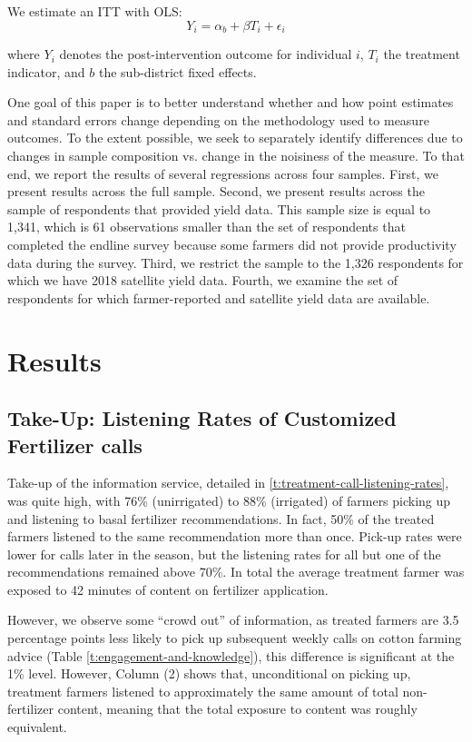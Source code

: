\documentclass{article}
\begin{document}
We estimate an ITT with OLS:
$$
Y_i = \alpha_b + \beta T_i + \epsilon_i
$$

where $Y_i$ denotes the post-intervention outcome for individual $i$, $T_i$ the treatment indicator, and $b$ the sub-district fixed effects.

One goal of this paper is to better understand whether and how point estimates and standard errors change depending on the methodology used to measure outcomes. To the extent possible, we seek to separately identify differences due to changes in sample composition vs. change in the noisiness of the measure. To that end, we report the results of several regressions across four samples. First, we present results across the full sample. Second, we present results across the sample of respondents that provided yield data. This sample size is equal to 1,341, which is 61 observations smaller than the set of respondents that completed the endline survey because some farmers did not provide productivity data during the survey. Third, we restrict the sample to the 1,326 respondents for which we have 2018 satellite yield data. Fourth, we examine the set of respondents for which farmer-reported and satellite yield data are available. 

\section{Results}

\subsection{Take-Up: Listening Rates of Customized Fertilizer calls}

Take-up of the information service, detailed in \ref{t:treatment-call-listening-rates}, was quite high, with 76\% (unirrigated) to 88\% (irrigated) of farmers picking up and listening to basal fertilizer recommendations. In fact, 50\% of the treated farmers listened to the same recommendation more than once. Pick-up rates were lower for calls later in the season, but the listening rates for all but one of the recommendations remained above 70\%. In total the average treatment farmer was exposed to 42 minutes of content on fertilizer application.

However, we observe some ``crowd out'' of information, as treated farmers are 3.5 percentage points less likely to pick up subsequent weekly calls on cotton farming advice (Table \ref{t:engagement-and-knowledge}), this difference is significant at the 1\% level. However, Column (2) shows that, unconditional on picking up, treatment farmers listened to approximately the same amount of total non-fertilizer content, meaning that the total exposure to content was roughly equivalent. 
\end{document}
